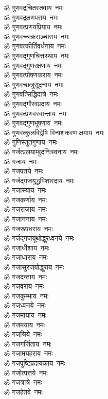 \begin{multicols}{2}
\begin{flushleft}
ॐ गुणवद्रचितस्तवाय~नमः\\
ॐ गुणवद्रक्षणपराय~नमः\\
ॐ गुणवत्प्रणयप्रियाय~नमः\\
ॐ गुणवच्चक्रसञ्चाराय~नमः\\
ॐ गुणवत्कीर्तिवर्धनाय~नमः\\
ॐ गुणवद्गुणचित्तस्थाय~नमः\\
ॐ गुणवद्गुणरक्षणाय~नमः\\
ॐ गुणवत्पोषणकराय~नमः\\
ॐ गुणवच्छत्रुसूदनाय~नमः\\
ॐ गुणवत्सिद्धिदात्रे~नमः\hfill{}\\
ॐ गुणवद्गौरवप्रदाय~नमः\\
ॐ गुणवत्प्रणवस्वान्ताय~नमः\\
ॐ गुणवद्गुणभूषणाय~नमः\\
ॐ गुणवत्कुलविद्वेषि विनाशकरण क्षमाय~नमः\\
ॐ गुणिस्तुतगुणाय~नमः\\
ॐ गर्जत्प्रलयाम्बुद\-निःस्वनाय~नमः\\
ॐ गजाय~नमः\\
ॐ गजपतये~नमः\\
ॐ गर्जद्गजयुद्धविशारदाय~नमः\\
ॐ गजास्याय~नमः\hfill{}\\
ॐ गजकर्णाय~नमः\\
ॐ गजराजाय~नमः\\
ॐ गजाननाय~नमः\\
ॐ गजरूपधराय~नमः\\
ॐ गर्जद्गजयूथोद्धुरध्वनये~नमः\\
ॐ गजाधीशाय~नमः\\
ॐ गजाधाराय~नमः\\
ॐ गजासुरजयोद्धुराय~नमः\\
ॐ गजदन्ताय~नमः\\
ॐ गजवराय~नमः\hfill{}\\
ॐ गजकुम्भाय~नमः\\
ॐ गजध्वनये~नमः\\
ॐ गजमायाय~नमः\\
ॐ गजमयाय~नमः\\
ॐ गजश्रिये~नमः\\
ॐ गजगर्जिताय~नमः\\
ॐ गजामयहराय~नमः\\
ॐ गजपुष्टिप्रदायकाय~नमः\\
ॐ गजोत्पत्तये~नमः\\
ॐ गजत्रात्रे~नमः\hfill{}\\
ॐ गजहेतवे~नमः\\

\end{flushleft}
\end{multicols}
